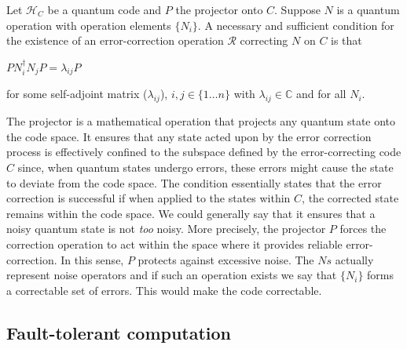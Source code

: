 \documentclass{Configuration_Files/PoliMi3i_thesis}
\begin{document}
\begin{theorem}
	 Let $\mathscr{H}_C$ be a quantum code and $P$ the projector onto $C$. Suppose $N$ is a quantum operation with operation elements $\{N_i\}$. A necessary and sufficient condition for the existence of an error-correction operation $\mathcal{R}$ correcting $N$ on $C$ is that
	
	\begin{center}
		$PN_i^{\dagger}N_jP = \lambda_{ij}P$
	\end{center}
	
	for some self-adjoint matrix ($\lambda_{ij}$), $i,j\in\{1 \dots n\}$ with $\lambda_{ij} \in \mathbb{C}$ and for all $N_i$. 
\end{theorem}

The projector is a mathematical operation that projects any quantum state onto the code space. It ensures that any state acted upon by the error correction process is effectively confined to the subspace defined by the error-correcting code $C$ since, when quantum states undergo errors, these errors might cause the state to deviate from the code space. \newline
The condition essentially states that the error correction is successful if when applied to the states within $C$, the corrected state remains within the code space. \newline
We could generally say that it ensures that a noisy quantum state is not {\it too} noisy. More precisely, the projector $P$ forces the correction operation to act within the space where it provides reliable error-correction. In this sense, $P$ protects against excessive noise. The $Ns$ actually represent noise operators and if such an operation exists we say that $\{N_i\}$ forms a correctable set of errors. This would make the code correctable. \newline



\subsection{Fault-tolerant computation}
\end{document}

